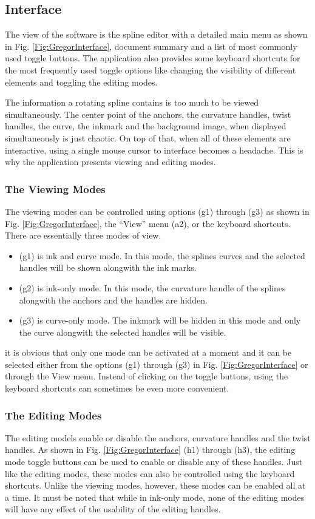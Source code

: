 \subsection{Interface}
{
    The view of the software is the spline editor with a detailed main menu as shown in Fig. \ref{Fig:GregorInterface}, document summary and a list of most commonly used toggle buttons. The application also provides some keyboard shortcuts for the most frequently used toggle options like changing the visibility of different elements and toggling the editing modes.

    The information a rotating spline contains is too much to be viewed simultaneously. The center point of the anchors, the curvature handles, twist handles, the curve, the inkmark and the background image, when displayed simultaneously is just chaotic. On top of that, when all of these elements are interactive, using a single mouse cursor to interface becomes a headache. This is why the application presents viewing and editing modes.
    \subsubsection{The Viewing Modes}
    {
        The viewing modes can be controlled using options (g1) through (g3) as shown in Fig.  \ref{Fig:GregorInterface}, the ``View'' menu (a2), or the keyboard shortcuts. There are essentially three modes of view.
        \begin{itemize}
          \item (g1) is ink and curve mode. In this mode, the splines curves and the selected handles will be shown alongwith the ink marks.
          \item (g2) is ink-only mode. In this mode, the curvature handle of the splines alongwith the anchors and the handles are hidden.
          \item (g3) is curve-only mode. The inkmark will be hidden in this mode and only the curve alongwith the selected handles will be visible.
        \end{itemize}
        it is obvious that only one mode can be activated at a moment and it can be selected either from the options (g1) through (g3) in Fig.  \ref{Fig:GregorInterface} or through the View menu. Instead of clicking on the toggle buttons, using the keyboard shortcuts can sometimes be even more convenient.
    }
    \subsubsection{The Editing Modes}
    {
        The editing models enable or disable the anchors, curvature handles and the twist handles. As shown in Fig. \ref{Fig:GregorInterface} (h1) through (h3), the editing mode toggle buttons can be used to enable or disable any of these handles. Just like the editing modes, these modes can also be controlled using the keyboard shortcuts. Unlike the viewing modes, however, these modes can be enabled all at a time. It must be noted that while in ink-only mode, none of the editing modes will have any effect of the usability of the editing handles.
    }

}
